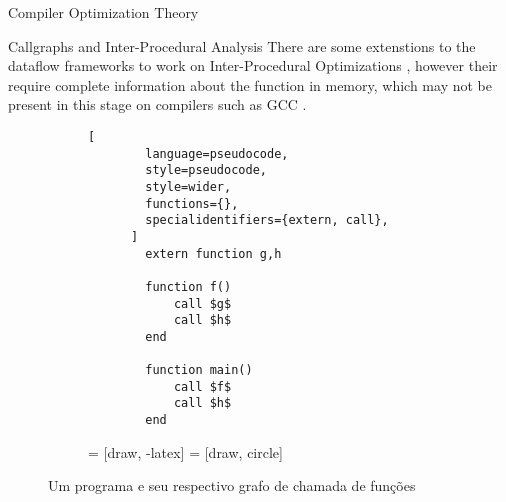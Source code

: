 \begin{section}{Compiler Optimization Theory}
\begin{section}{Callgraphs and Inter-Procedural Analysis}
There are some extenstions to the dataflow frameworks to work on Inter-Procedural
Optimizations \citep{khedker2009data}, however their require complete information
about the function in memory, which may not be present in this stage on compilers
such as GCC \citep{gcc_ipa}.

\begin{figure}[ht]
\centering
  \begin{subfigure}[b]{0.40\textwidth}
      \begin{lstlisting}[
        language=pseudocode,
        style=pseudocode,
        style=wider,
        functions={},
        specialidentifiers={extern, call},
      ]
        extern function g,h

        function f()
            call $g$
            call $h$
        end

        function main()
            call $f$
            call $h$
        end
      \end{lstlisting}
  \end{subfigure}
  \begin{subfigure}[b]{0.40\textwidth}
     = [draw, -latex]
     = [draw, circle]
    \begin{center}
    \end{center}
  \end{subfigure}
  \caption{Um programa e seu respectivo grafo de chamada de funções}
  \label{fig:call_graph}
\end{figure}

\begin{subsection}


\end{subsection}

\end{section}

\end{section}

